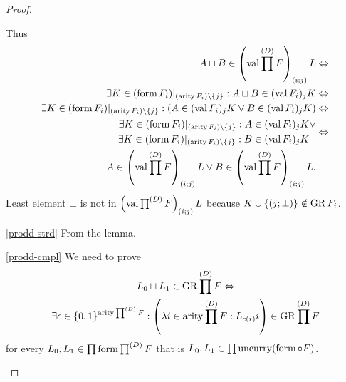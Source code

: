 \begin{proof}
\begin{widedisorder}
Thus
\begin{align*}
A\sqcup B\in\left(\operatorname{val}\prod^{(D)}F\right)_{(i;j)}L & \Leftrightarrow\\
\exists K\in(\operatorname{form} F_{i})|_{(\operatorname{arity} F_{i})\setminus\{j\}}:A\sqcup B\in(\operatorname{val} F_{i})_{j}K & \Leftrightarrow\\
\exists K\in(\operatorname{form} F_{i})|_{(\operatorname{arity} F_{i})\setminus\{j\}}:(A\in(\operatorname{val} F_{i})_{j}K\lor B\in(\operatorname{val} F_{i})_{j}K) & \Leftrightarrow\\
\begin{aligned}\exists K\in(\operatorname{form} F_{i})|_{(\operatorname{arity} F_{i})\setminus\{j\}}:A\in(\operatorname{val} F_{i})_{j}K & \lor\\
\exists K\in(\operatorname{form} F_{i})|_{(\operatorname{arity} F_{i})\setminus\{j\}}:B\in(\operatorname{val} F_{i})_{j}K
\end{aligned}
 & \Leftrightarrow\\
A\in\left(\operatorname{val}\prod^{(D)}F\right)_{(i;j)}L\lor B\in\left(\operatorname{val}\prod^{(D)}F\right)_{(i;j)}L.
\end{align*}
Least element $\bot$ is not in $\left(\operatorname{val}\prod^{(D)}F\right)_{(i;j)}L$
because $K\cup\{(j;\bot)\}\notin\operatorname{GR} F_{i}$.

\item [{\ref{prodd-strd}}] From the lemma.
\item [{\ref{prodd-cmpl}}] We need to prove
\begin{multline*}
L_{0}\sqcup L_{1}\in\operatorname{GR}\prod^{(D)}F\Leftrightarrow\\
\exists c\in\{0,1\}^{\operatorname{arity}\prod^{(D)}F}:\left(\lambda i\in\operatorname{arity}\prod^{(D)}F:L_{c(i_{})}i\right)\in\operatorname{GR}\prod^{(D)}F
\end{multline*}
for every $L_{0},L_{1}\in\prod\operatorname{form}\prod^{(D)}F$ that is $L_{0},L_{1}\in\prod\operatorname{uncurry}(\operatorname{form}\circ F)$.



\end{widedisorder}
\end{proof}
